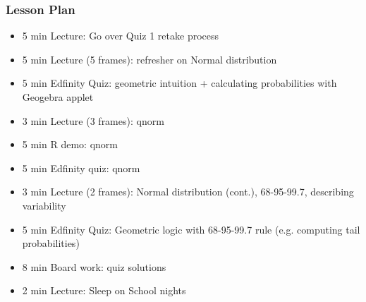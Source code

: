 \begin{frame}
    \frametitle{Lesson Plan}
    \begin{itemize}
        \item 5 min Lecture: Go over Quiz 1 retake process

        \item 5 min Lecture (5 frames): refresher on Normal distribution 
        \item 5 min Edfinity Quiz: geometric intuition + calculating probabilities with Geogebra applet

        \item 3 min Lecture (3 frames): qnorm
        \item 5 min R demo: qnorm
        \item 5 min Edfinity quiz: qnorm
        \item 3 min Lecture (2 frames): Normal distribution (cont.), 68-95-99.7, describing variability
        \item 5 min Edfinity Quiz: Geometric logic with 68-95-99.7 rule (e.g. computing tail probabilities)
        \item 8 min Board work: quiz solutions
        \item 2 min Lecture: Sleep on School nights
    \end{itemize}
\end{frame}




